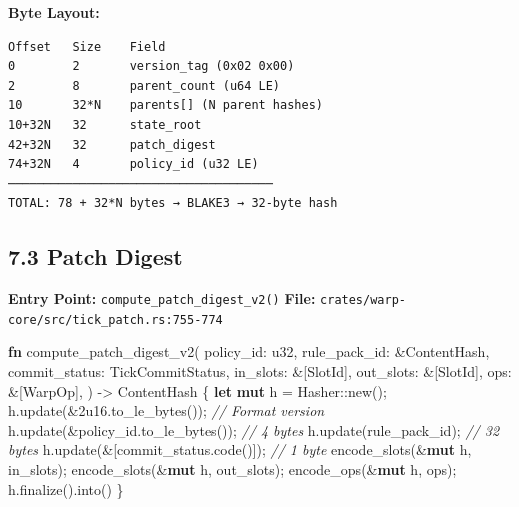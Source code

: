 \documentclass[
]{book}
\newenvironment{Shaded}{}{}
\newcommand{\BuiltInTok}[1]{\textcolor[rgb]{0.00,0.50,0.00}{#1}}
\newcommand{\CommentTok}[1]{\textcolor[rgb]{0.38,0.63,0.69}{\textit{#1}}}
\newcommand{\DataTypeTok}[1]{\textcolor[rgb]{0.56,0.13,0.00}{#1}}
\newcommand{\DecValTok}[1]{\textcolor[rgb]{0.25,0.63,0.44}{#1}}
\newcommand{\KeywordTok}[1]{\textcolor[rgb]{0.00,0.44,0.13}{\textbf{#1}}}
\newcommand{\NormalTok}[1]{#1}
\newcommand{\OperatorTok}[1]{\textcolor[rgb]{0.40,0.40,0.40}{#1}}
\newcommand{\PreprocessorTok}[1]{\textcolor[rgb]{0.74,0.48,0.00}{#1}}
\begin{document}
\textbf{Byte Layout:}

\begin{verbatim}
Offset   Size    Field
0        2       version_tag (0x02 0x00)
2        8       parent_count (u64 LE)
10       32*N    parents[] (N parent hashes)
10+32N   32      state_root
42+32N   32      patch_digest
74+32N   4       policy_id (u32 LE)
─────────────────────────────────────
TOTAL: 78 + 32*N bytes → BLAKE3 → 32-byte hash
\end{verbatim}

\subsection{7.3 Patch Digest}\label{patch-digest}

\textbf{Entry Point:} \texttt{compute\_patch\_digest\_v2()}
\textbf{File:} \texttt{crates/warp-core/src/tick\_patch.rs:755-774}

\begin{Shaded}
\begin{Highlighting}[]
\KeywordTok{fn}\NormalTok{ compute\_patch\_digest\_v2(}
\NormalTok{    policy\_id}\OperatorTok{:} \DataTypeTok{u32}\OperatorTok{,}
\NormalTok{    rule\_pack\_id}\OperatorTok{:} \OperatorTok{\&}\NormalTok{ContentHash}\OperatorTok{,}
\NormalTok{    commit\_status}\OperatorTok{:}\NormalTok{ TickCommitStatus}\OperatorTok{,}
\NormalTok{    in\_slots}\OperatorTok{:} \OperatorTok{\&}\NormalTok{[SlotId]}\OperatorTok{,}
\NormalTok{    out\_slots}\OperatorTok{:} \OperatorTok{\&}\NormalTok{[SlotId]}\OperatorTok{,}
\NormalTok{    ops}\OperatorTok{:} \OperatorTok{\&}\NormalTok{[WarpOp]}\OperatorTok{,}
\NormalTok{) }\OperatorTok{{-}\textgreater{}}\NormalTok{ ContentHash }\OperatorTok{\{}
    \KeywordTok{let} \KeywordTok{mut}\NormalTok{ h }\OperatorTok{=} \BuiltInTok{Hasher}\PreprocessorTok{::}\NormalTok{new()}\OperatorTok{;}
\NormalTok{    h}\OperatorTok{.}\NormalTok{update(}\OperatorTok{\&}\DecValTok{2u16}\OperatorTok{.}\NormalTok{to\_le\_bytes())}\OperatorTok{;}         \CommentTok{// Format version}
\NormalTok{    h}\OperatorTok{.}\NormalTok{update(}\OperatorTok{\&}\NormalTok{policy\_id}\OperatorTok{.}\NormalTok{to\_le\_bytes())}\OperatorTok{;}    \CommentTok{// 4 bytes}
\NormalTok{    h}\OperatorTok{.}\NormalTok{update(rule\_pack\_id)}\OperatorTok{;}                \CommentTok{// 32 bytes}
\NormalTok{    h}\OperatorTok{.}\NormalTok{update(}\OperatorTok{\&}\NormalTok{[commit\_status}\OperatorTok{.}\NormalTok{code()])}\OperatorTok{;}     \CommentTok{// 1 byte}
\NormalTok{    encode\_slots(}\OperatorTok{\&}\KeywordTok{mut}\NormalTok{ h}\OperatorTok{,}\NormalTok{ in\_slots)}\OperatorTok{;}
\NormalTok{    encode\_slots(}\OperatorTok{\&}\KeywordTok{mut}\NormalTok{ h}\OperatorTok{,}\NormalTok{ out\_slots)}\OperatorTok{;}
\NormalTok{    encode\_ops(}\OperatorTok{\&}\KeywordTok{mut}\NormalTok{ h}\OperatorTok{,}\NormalTok{ ops)}\OperatorTok{;}
\NormalTok{    h}\OperatorTok{.}\NormalTok{finalize()}\OperatorTok{.}\NormalTok{into()}
\OperatorTok{\}}
\end{Highlighting}
\end{Shaded}
\end{document}
